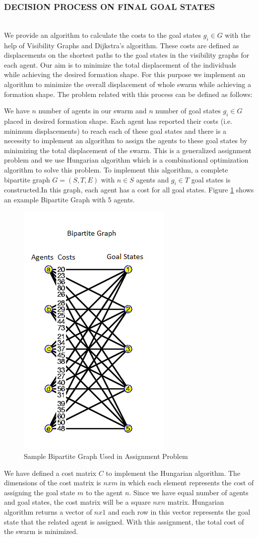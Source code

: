 \documentclass[letterpaper, 10 pt, conference]{ieeeconf}  %
\begin{document}
\subsubsection{DECISION PROCESS ON FINAL GOAL STATES}\hspace{0pt} \\
We provide an algorithm to calculate the costs to the goal states $g_i \in G$ with the help of Visibility Graphs and Dijkstra's algorithm. These costs are defined as displacements on the shortest paths to the goal states in the visibility graphs for each agent. Our aim is to minimize the total displacement of the individuals while achieving the desired formation shape. For this purpose we implement an algorithm to minimize the overall displacement of whole swarm while achieving a formation shape. The problem related with this process can be defined as follows:

We have $n$ number of agents in our swarm and $n$ number of goal states $g_i \in G$ placed in desired formation shape. Each agent has reported their costs (i.e. minimum displacements) to reach each of these goal states and there is a necessity to implement an algorithm to assign the agents to these goal states by minimizing the total displacement of the swarm. This is a generalized assignment problem and we use Hungarian algorithm which is a combinational optimization algorithm to solve this problem. To implement this algorithm, a complete bipartite graph $G=(S,T,E)$ with $n \in S$ agents and $g_i \in T$ goal states is constructed.In this graph, each agent has a cost for all goal states. Figure \ref{biprrtti} shows an example Bipartite Graph with 5 agents.

\begin{figure}[thpb]
\centering
\includegraphics[width=.25\textwidth]{bipartite}
\caption{Sample Bipartite Graph Used in Assignment Problem \cite{102}} \label{biprrtti}
\end{figure}

We have defined a cost matrix  $C$ to implement the Hungarian algorithm. The dimensions of the cost matrix is $nxm$ in which each element represents the cost of assigning the goal state $m$ to the agent $n$.  Since we have equal number of agents and goal states, the cost matrix will be a square $nxn$ matrix. Hungarian algorithm returns a vector of $nx1$ and each row in this vector represents the goal state that the related agent is assigned. With this assignment, the total cost of the swarm is minimized.
\end{document}
